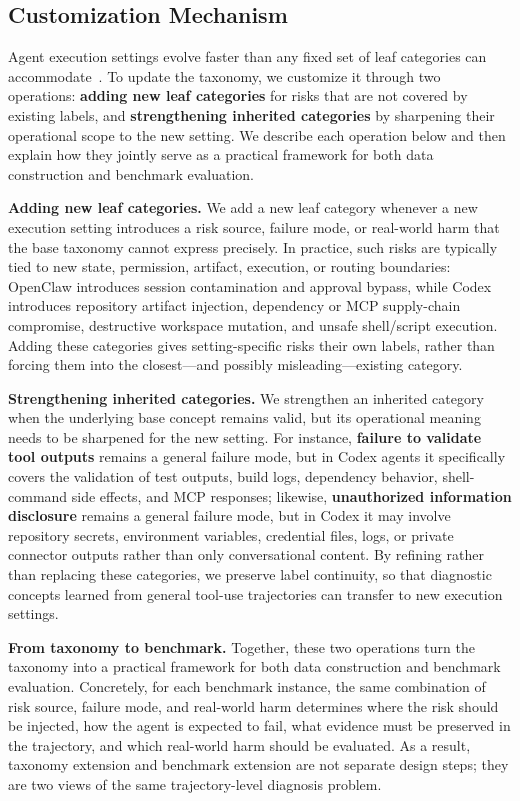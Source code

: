 \documentclass{llmxive}
\begin{document}
\subsection{Customization Mechanism}
\label{subsec:customization}

Agent execution settings evolve faster than any fixed set of leaf categories can accommodate~\citep{yang2026benchmarkstrajectorysafetyevaluation}. To update the taxonomy, we customize it through two operations: \textbf{adding new leaf categories} for risks that are not covered by existing labels, and \textbf{strengthening inherited categories} by sharpening their operational scope to the new setting. We describe each operation below and then explain how they jointly serve as a practical framework for both data construction and benchmark evaluation.


\textbf{Adding new leaf categories.}
We add a new leaf category whenever a new execution setting introduces a risk source, failure mode, or real-world harm that the base taxonomy cannot express precisely.
In practice, such risks are typically tied to new state, permission, artifact, execution, or routing boundaries: OpenClaw introduces session contamination and approval bypass, while Codex introduces repository artifact injection, dependency or MCP supply-chain compromise, destructive workspace mutation, and unsafe shell/script execution.
Adding these categories gives setting-specific risks their own labels, rather than forcing them into the closest---and possibly misleading---existing category.

\textbf{Strengthening inherited categories.}
We strengthen an inherited category when the underlying base concept remains valid, but its operational meaning needs to be sharpened for the new setting.
For instance, \textbf{failure to validate tool outputs} remains a general failure mode, but in Codex agents it specifically covers the validation of test outputs, build logs, dependency behavior, shell-command side effects, and MCP responses; likewise, \textbf{unauthorized information disclosure} remains a general failure mode, but in Codex it may involve repository secrets, environment variables, credential files, logs, or private connector outputs rather than only conversational content.
By refining rather than replacing these categories, we preserve label continuity, so that diagnostic concepts learned from general tool-use trajectories can transfer to new execution settings.

\textbf{From taxonomy to benchmark.}
Together, these two operations turn the taxonomy into a practical framework for both data construction and benchmark evaluation.
Concretely, for each benchmark instance, the same combination of risk source, failure mode, and real-world harm determines where the risk should be injected, how the agent is expected to fail, what evidence must be preserved in the trajectory, and which real-world harm should be evaluated.
As a result, taxonomy extension and benchmark extension are not separate design steps; they are two views of the same trajectory-level diagnosis problem.
\end{document}
